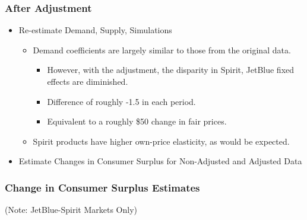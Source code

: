 \documentclass[xcolor=dvipsnames]{beamer}
\begin{document}
    \begin{frame}
        \frametitle{After Adjustment}
        \begin{itemize}
            \item Re-estimate Demand, Supply, Simulations
            \begin{itemize}
                \item Demand coefficients are largely similar to those from the original data.
                \begin{itemize}
                \item However, with the adjustment, the disparity in Spirit, JetBlue fixed effects are diminished.
                \item Difference of roughly -1.5 in each period.
                \item Equivalent to a roughly \$50 change in fair prices.
                \end{itemize}
                \item Spirit products have higher own-price elasticity, as would be expected. 
            \end{itemize}
            \item Estimate Changes in Consumer Surplus for Non-Adjusted and Adjusted Data
        \end{itemize}
    \end{frame}

    \begin{frame}
        \frametitle{Change in Consumer Surplus Estimates}
        \tiny
        \centering
{}

    (Note: JetBlue-Spirit Markets Only)
    \end{frame}
\end{document}

